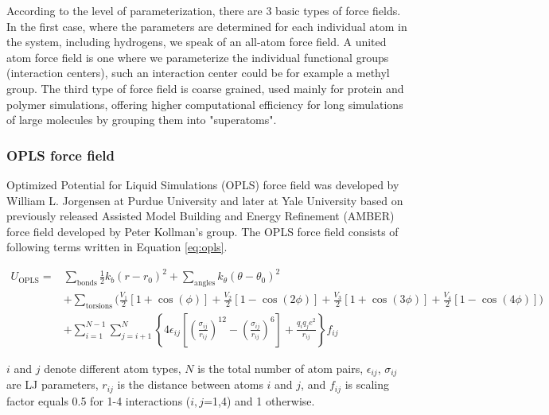 According to the level of parameterization, there are 3 basic types of force fields. In the first case, where the parameters are determined for each individual atom in the system, including hydrogens, we speak of an all-atom force field. A united atom force field is one where we parameterize the individual functional groups (interaction centers), such an interaction center could be for example a methyl group. The third type of force field is coarse grained, used mainly for protein and polymer simulations, offering higher computational efficiency for long simulations of large molecules by grouping them into "superatoms". \cite{da_silva_are_2020}

\subsubsection{OPLS force field}

Optimized Potential for Liquid Simulations (OPLS) force field was developed by William L. Jorgensen \cite{jorgensen_opls_1988} at Purdue University and later at Yale University based on previously released Assisted Model Building and Energy Refinement (AMBER) force field developed by Peter Kollman's group. \cite{cornell_second_1995} The OPLS force field consists of following terms written in Equation \ref{eq:opls}. 
	
	\begin{equation}
		\begin{aligned}
			U_{\text{OPLS}} = & \sum_{\text{bonds}} \frac{1}{2} k_b(r-r_0)^2 + \sum_{\text{angles}} k_{\theta} (\theta-\theta_0)^2 \\
			& + \sum_{\text{torsions}} \Biggl( \frac {V_1} {2} \left [ 1 + \cos (\phi) \right ] + \frac {V_2} {2} \left [ 1 - \cos (2\phi) \right ] 
			+ \frac {V_3} {2} \left [ 1 + \cos (3\phi) \right ] + \frac {V_4} {2} \left [ 1 - \cos (4\phi) \right ] \Biggr) \\
			& + \sum_{i=1}^{N-1} \sum_{j=i+1}^N \left\lbrace 4\epsilon_{ij} \left[ \left( \frac{\sigma_{ij}}{r_{ij}} \right)^{12} - \left( \frac{\sigma_{ij}}{r_{ij}} \right)^6 \right] + \frac{q_iq_je^2}{r_{ij}} \right\rbrace f_{ij}
		\end{aligned}
		\label{eq:opls}
	\end{equation}
	
$i$ and $j$ denote different atom types, $N$ is the total number of atom pairs, $\epsilon_{ij}$, $\sigma_{ij}$ are LJ parameters, $r_{ij}$ is the distance between atoms $i$ and $j$, and $f_{ij}$ is scaling factor equals 0.5 for 1-4 interactions ($i,j$=1,4) and 1 otherwise.
	
